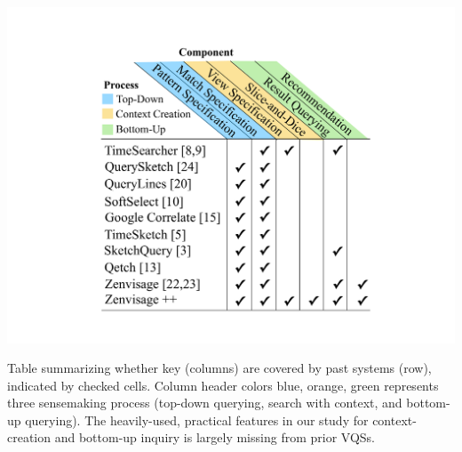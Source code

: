 \begin{table}
		\centering
    \includegraphics[width=0.8\linewidth]{figures/related_works_table.pdf}
    \caption{Table summarizing whether key  (columns) are covered by past systems (row), indicated by checked cells. Column header colors blue, orange, green represents three sensemaking process (top-down querying, search with context, and bottom-up querying). The heavily-used, practical features in our study for context-creation and bottom-up inquiry is largely missing from prior VQSs.}
    \label{table:relatedwork}
    \vspace{-10pt}
\end{table}
